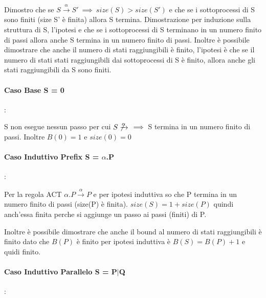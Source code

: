 \documentclass{article}
\newcommand{\passo}{\xrightarrow{\alpha}}
\begin{document}
Dimostro che se $ S \xrightarrow{\alpha}  S' ~ \implies ~ size(S) > size(S') $ e che se i sottoprocessi di S sono finiti (size S' è finita) allora S termina.
Dimostrazione per induzione sulla struttura di S, l'ipotesi e che se i sottoprocessi di S terminano in un numero finito di passi allora anche S termina in un numero finito di passi.
Inoltre è possibile dimostrare che anche il numero di stati raggiungibili è finito, l'ipotesi è che se il numero di stati stati raggiungibili dai sottoprocessi di S è finito, allora anche gli stati raggiungibili da S sono finiti.

\paragraph{Caso Base S = 0}: 

S non esegue nessun passo per cui $S \not\passo$  $\implies$ S termina in un numero  finito di passi. Inoltre $B(0) = 1$ e $size(0) = 0$

\paragraph{Caso Induttivo Prefix S = $\alpha$.P}:

Per la regola ACT $\alpha.P \xrightarrow{\alpha}P$ e per ipotesi induttiva so che P termina in un numero finito di passi (size(P) è finita). $size(S) = 1+ size(P)$ quindi anch'essa finita perche si aggiunge un passo ai passi (finiti) di P.

Inoltre è possibile dimostrare che anche il bound al numero di stati raggiungibili è finito dato che $B(P)$ è finito per ipotesi induttiva è $B(S) = B(P)+1$ e quidi finito.

\paragraph{Caso Induttivo Parallelo S = P$|$Q}:
\end{document}
